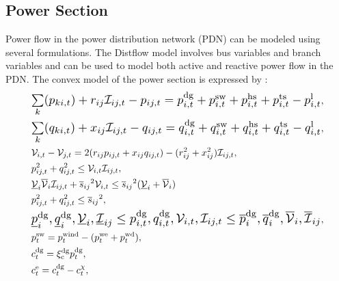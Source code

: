 \documentclass[conference]{IEEEtran}
\begin{document}
\subsection{Power Section} \label{sec:PFPower} 
Power flow in the power distribution network (PDN) can be modeled using several formulations. The Distflow model involves bus variables and branch variables and can be used to model both active and reactive power flow in the PDN. The convex model of the power section is expressed by \cite{li2017convex}:
\begin{subequations} \label{eq_PDNmodel}
	\begin{align}
 &\resizebox{.88\hsize}{!}{$\sum\limits_{k}(p_{ki,t})+r_{ij}{\mathcal{I}}_{ij,t}-p_{ij,t}=p^\mathrm{dg}_{i,t}+p^\mathrm{sw}_{i,t}+p^\mathrm{hs}_{i,t}+p^\mathrm{ts}_{i,t}-p^\mathrm{l}_{i,t}$}, \label{eq_PDN1}\\
&\resizebox{.88\hsize}{!}{$\sum\limits_{k}(q_{ki,t})+x_{ij}{\mathcal{I}}_{ij,t}-q_{ij,t}=q^\mathrm{dg}_{i,t}+q^\mathrm{sw}_{i,t}+q^\mathrm{hs}_{i,t}+q^\mathrm{ts}_{i,t}-q^\mathrm{l}_{i,t}$}, \label{eq_PDN2}\\
&\mathcal{V}_{i,t}-\mathcal{V}_{j,t}=2(r_{ij}p_{ij,t}+x_{ij}q_{ij,t})-(r^\mathrm{2}_{ij}+x^\mathrm{2}_{ij}) {\mathcal{I}}_{ij,t}, \label{eq_PDN3}\\
&p_{ij,t}^2+q_{ij,t}^2 \leq \mathcal{V}_{i,t}{\mathcal{I}}_{ij,t},\label{eq_PDN4}\\
&\underline{\mathcal{V}}_{i} \overline{\mathcal{V}}_{i} {\mathcal{I}}_{ij,t} + {\overline{s}_{ij}}^2 \mathcal{V}_{i,t} \leq {\overline{s}_{ij}}^2 (\underline{\mathcal{V}}_{i} + \overline{\mathcal{V}}_{i})\label{eq_PDN4_2}\\
&p_{ij,t}^2+q_{ij,t}^2\leq {\overline{s}_{ij}}^2,\label{eq_PDN5}\\
&\resizebox{.88\hsize}{!}{$\underline{p}^\mathrm{dg}_{i},\underline{q}^\mathrm{dg}_{i},\underline{\mathcal{V}}_{i},\underline{\mathcal{I}}_{ij} \leq p^\mathrm{dg}_{i,t},q^\mathrm{dg}_{i,t},\mathcal{V}_{i,t},\mathcal{I}_{ij,t}\leq \overline{p}^\mathrm{dg}_{i},\overline{q}^\mathrm{dg}_{i},\overline{\mathcal{V}}_{i},\overline{\mathcal{I}}_{ij}$}, \label{eq_PDN6}\\
&p^\textrm{sw}_t = p^\textrm{wind}_t - (p^\textrm{we}_t + p^\textrm{wd}_t), \label{eq_netPower}\\
&c_t^\textrm{dg} = \xi^\textrm{dg}_\textrm{c}p^\textrm{dg}_t,\label{eq_CCS_1}\\
&c^\textrm{e}_t = c_t^\textrm{dg} -  c^{\chi}_t,\label{eq_CCS_2}
	\end{align}
\end{subequations}
\end{document}
